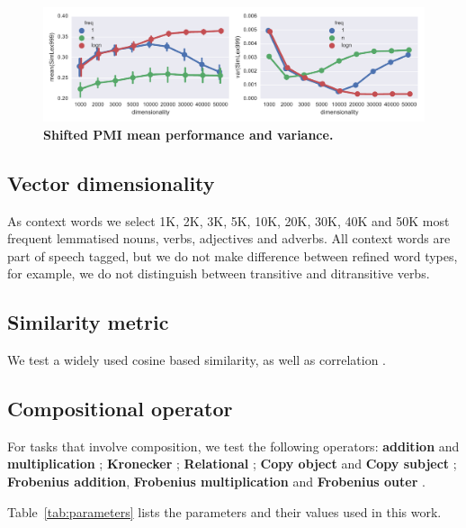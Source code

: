 \documentclass[11pt,letterpaper]{article}
\begin{document}
\begin{figure}[ht]
  \centering
  \includegraphics[width=\textwidth]{supplement/figures/simlex-ppmi}
  \caption{\textbf{Shifted PMI mean performance and variance.}}
  \label{fig:ppmi-performance}
\end{figure}

\subsection{Vector dimensionality}
\label{sec:vect-dimens}

As context words we select 1K, 2K, 3K, 5K, 10K, 20K, 30K, 40K and 50K most frequent lemmatised nouns, verbs, adjectives and adverbs. All context words are part of speech tagged, but we do not make difference between refined word types, for example, we do not distinguish between transitive and ditransitive verbs.

\subsection{Similarity metric}
\label{sec:similarity-metric}

We test a widely used cosine based similarity, as well as correlation \cite{kiela-clark:2014:CVSC}.

\subsection{Compositional operator}
\label{sec:comp-oper}

For tasks that involve composition, we test the following operators: \textbf{addition}
and \textbf{multiplication} \cite{mitchell2010composition}; \textbf{Kronecker} \cite{Grefenstette:2011:ETV:2140490.2140497}; \textbf{Relational} \cite{Grefenstette:2011:ESC:2145432.2145580}; \textbf{Copy object} and \textbf{Copy subject} \cite{Kartsaklis12aunified}; \textbf{Frobenius addition}, \textbf{Frobenius multiplication} and \textbf{Frobenius outer} \cite{kartsadrqpl2014}.

Table~\ref{tab:parameters} lists the parameters and their values used in this work.
\end{document}
